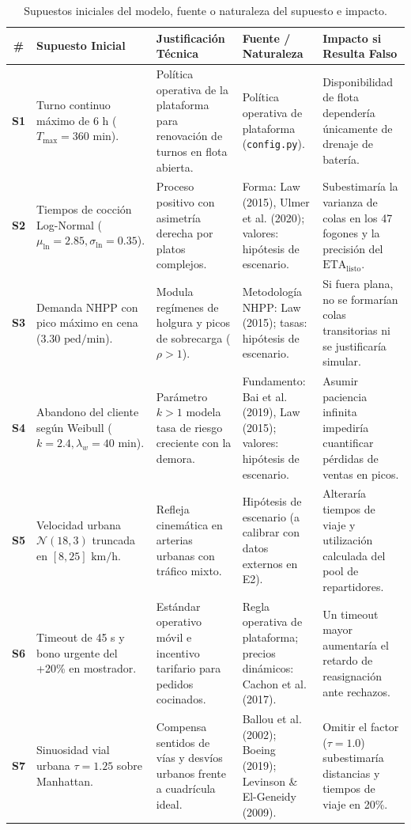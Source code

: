 \documentclass[11pt,letterpaper]{article}
\begin{document}
\begin{table}[htbp]
\centering
\small
\caption{Supuestos iniciales del modelo, fuente o naturaleza del supuesto e impacto.}
\begin{tabularx}{\textwidth}{c p{3.8cm} p{3.5cm} p{3.5cm} X}
\toprule
\textbf{\#} & \textbf{Supuesto Inicial} & \textbf{Justificación Técnica} & \textbf{Fuente / Naturaleza} & \textbf{Impacto si Resulta Falso} \\
\midrule
\textbf{S1} & Turno continuo máximo de 6 h ($T_{\max} = 360\text{ min}$). & Política operativa de la plataforma para renovación de turnos en flota abierta. & Política operativa de plataforma (\texttt{config.py}). & Disponibilidad de flota dependería únicamente de drenaje de batería. \\
\addlinespace
\textbf{S2} & Tiempos de cocción Log-Normal ($\mu_{\ln}=2.85, \sigma_{\ln}=0.35$). & Proceso positivo con asimetría derecha por platos complejos. & Forma: Law (2015), Ulmer et al. (2020); valores: hipótesis de escenario. & Subestimaría la varianza de colas en los 47 fogones y la precisión del $\text{ETA}_{\text{listo}}$. \\
\addlinespace
\textbf{S3} & Demanda NHPP con pico máximo en cena ($3.30\text{ ped/min}$). & Modula regímenes de holgura y picos de sobrecarga ($\rho > 1$). & Metodología NHPP: Law (2015); tasas: hipótesis de escenario. & Si fuera plana, no se formarían colas transitorias ni se justificaría simular. \\
\addlinespace
\textbf{S4} & Abandono del cliente según Weibull ($k=2.4, \lambda_w=40\text{ min}$). & Parámetro $k > 1$ modela tasa de riesgo creciente con la demora. & Fundamento: Bai et al. (2019), Law (2015); valores: hipótesis de escenario. & Asumir paciencia infinita impediría cuantificar pérdidas de ventas en picos. \\
\addlinespace
\textbf{S5} & Velocidad urbana $\mathcal{N}(18, 3)$ truncada en $[8, 25]\text{ km/h}$. & Refleja cinemática en arterias urbanas con tráfico mixto. & Hipótesis de escenario (a calibrar con datos externos en E2). & Alteraría tiempos de viaje y utilización calculada del pool de repartidores. \\
\addlinespace
\textbf{S6} & Timeout de 45 s y bono urgente del +20\% en mostrador. & Estándar operativo móvil e incentivo tarifario para pedidos cocinados. & Regla operativa de plataforma; precios dinámicos: Cachon et al. (2017). & Un timeout mayor aumentaría el retardo de reasignación ante rechazos. \\
\addlinespace
\textbf{S7} & Sinuosidad vial urbana $\tau = 1.25$ sobre Manhattan. & Compensa sentidos de vías y desvíos urbanos frente a cuadrícula ideal. & Ballou et al. (2002); Boeing (2019); Levinson \& El-Geneidy (2009). & Omitir el factor ($\tau=1.0$) subestimaría distancias y tiempos de viaje en 20\%. \\

\end{tabularx}
\end{table}
\end{document}
